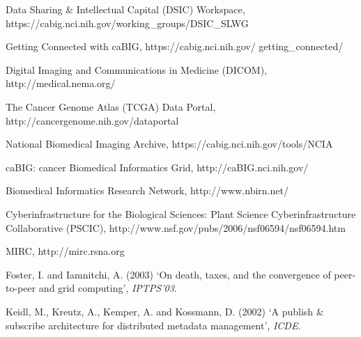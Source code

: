 \documentclass{singlecol-new}
\theoremstyle{TH}{
\newtheorem{lemma}{Lemma}
\newtheorem{theorem}[lemma]{Theorem}
\newtheorem{corrolary}[lemma]{Corrolary}
\newtheorem{conjecture}[lemma]{Conjecture}
\newtheorem{proposition}[lemma]{Proposition}
\newtheorem{claim}[lemma]{Claim}
\newtheorem{stheorem}[lemma]{Wrong Theorem}
\newtheorem{algorithm}{Algorithm}
}
\theoremstyle{THrm}{
\newtheorem{definition}{Definition}[section]
\newtheorem{question}{Question}[section]
\newtheorem{remark}{Remark}
\newtheorem{scheme}{Scheme}
}
\theoremstyle{THhit}{
\newtheorem{case}{Case}[section]
}
\begin{document}
\begin{thebibliography}{10}
 Data
Sharing \& Intellectual Capital (DSIC) Workspace,
https://cabig.nci.nih.gov/working\_groups/DSIC\_SLWG

Getting Connected with caBIG, https://cabig.nci.nih.gov/\break
getting\_connected/

 Digital Imaging and
Communications in Medicine (DICOM), http://medical.nema.org/

The Cancer Genome Atlas (TCGA) Data Portal,
http://cancergenome.nih.gov/dataportal

 National
Biomedical Imaging Archive, https://cabig.nci.nih.gov/tools/NCIA

caBIG: cancer Biomedical Informatics Grid, http://caBIG.nci.nih.gov/

Biomedical Informatics Research Network, http://www.nbirn.net/

Cyberinfrastructure for the Biological Sciences: Plant Science
Cyberinfrastructure Collaborative (PSCIC),
http://www.nsf.gov/pubs/2006/nsf06594/nsf06594.htm

MIRC, http://mirc.rsna.org

 Foster, I. and Iamnitchi, A.
(2003) `On death, taxes, and the convergence of peer-to-peer and
grid computing', {\it IPTPS'03}.

Keidl, M., Kreutz, A., Kemper, A. and Kossmann, D. (2002) `A publish
{\&} subscribe architecture for distributed metadata management',
{\it ICDE}.


\end{thebibliography}
\end{document}
